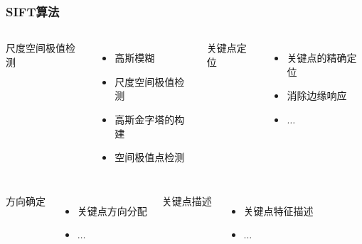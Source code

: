 \documentclass[presentation,aspectratio=1610]{beamer}
\begin{document}
\begin{frame}
	\frametitle{\textbf{SIFT算法}}
	\begin{columns}
		尺度空间极值检测
		
	\begin{itemize}
		\item 高斯模糊
		\item 尺度空间极值检测
		\item  高斯金字塔的构建
		\item  空间极值点检测
	\end{itemize}		 \pause
		关键点定位
		
		\begin{itemize}
			\item 关键点的精确定位
			\item  消除边缘响应
			\item $\dots$
		\end{itemize}	
		
	\end{columns} \vspace{1.0cm} \pause
	
	\begin{columns}
		\column{.5\textwidth}
		方向确定
		\begin{itemize}
			\item 关键点方向分配
			\item $\dots$
		\end{itemize} \pause
		
		关键点描述
		\begin{itemize}
			\item 关键点特征描述
			\item $\dots$			
		\end{itemize}			
	\end{columns}
\end{frame}
\end{document}
